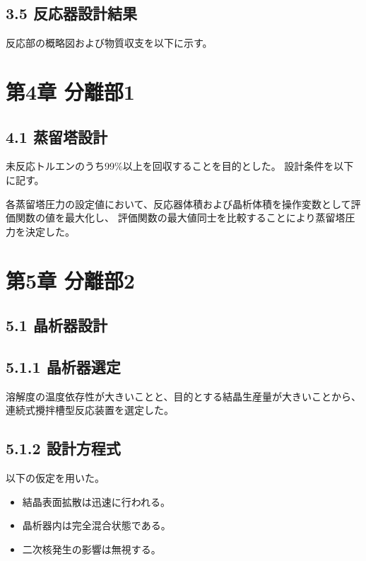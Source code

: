 \documentclass[a4j]{jsarticle}
\begin{document}
\subsection*{3.5 反応器設計結果} 
反応部の概略図および物質収支を以下に示す。

\newpage
\section*{第4章 分離部1}
\subsection*{4.1 蒸留塔設計}
未反応トルエンのうち99\%以上を回収することを目的とした。
設計条件を以下に記す。

各蒸留塔圧力の設定値において、反応器体積および晶析体積を操作変数として評価関数の値を最大化し、
評価関数の最大値同士を比較することにより蒸留塔圧力を決定した。

\newpage
\section*{第5章 分離部2}
\subsection*{5.1 晶析器設計}
\subsection*{5.1.1 晶析器選定}
溶解度の温度依存性が大きいことと、目的とする結晶生産量が大きいことから、
連続式攪拌槽型反応装置を選定した。
\subsection*{5.1.2 設計方程式}
以下の仮定を用いた。
\begin{itemize} 
    \item 結晶表面拡散は迅速に行われる。\\
    \item 晶析器内は完全混合状態である。\\
    \item 二次核発生の影響は無視する。\\
\end{itemize}
\end{document}
